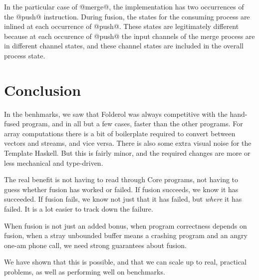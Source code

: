 In the particular case of @merge@, the implementation has two occurrences of the @push@ instruction. During fusion, the states for the consuming process are inlined at each occurrence of @push@. These states are legitimately different because at each occurence of @push@ the input channels of the merge process are in different channel states, and these channel states are included in the overall process state.





\section{Conclusion}
In the benhmarks, we saw that Folderol was always competitive with the hand-fused program, and in all but a few cases, faster than the other programs.
For array computations there is a bit of boilerplate required to convert between vectors and streams, and vice versa.
There is also some extra visual noise for the Template Haskell.
But this is fairly minor, and the required changes are more or less mechanical and type-driven.

The real benefit is not having to read through Core programs, not having to guess whether fusion has worked or failed.
If fusion succeeds, we know it has succeeded.
If fusion fails, we know not just that it has failed, but \emph{where} it has failed.
It is a lot easier to track down the failure.

When fusion is not just an added bonus, when program correctness depends on fusion, when a stray unbounded buffer means a crashing program and an angry one-am phone call, we need strong guarantees about fusion.

We have shown that this is possible, and that we can scale up to real, practical problems, as well as performing well on benchmarks.

